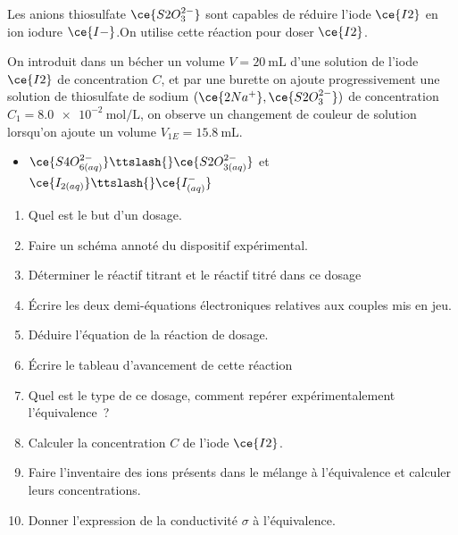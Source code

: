Les anions thiosulfate $\ce{S2O^{2-}_3}$ sont capables de réduire l'iode
$\ce{I2}$ en ion iodure $\ce{I-}$.On utilise cette réaction pour doser
$\ce{I2}$.

On introduit dans un bécher un volume $V=\qty{20}{\mL}$ d'une solution de l'iode
$\ce{I2}$ de concentration $C$, et par une burette on ajoute progressivement une
solution de thiosulfate de sodium $(\ce{2Na^{+}}, \ce{S2O^{2-}_3})$ de
concentration $C_1=\qty{8.0e-2}{\mol\per\L}$, on observe un changement de
couleur de solution lorsqu'on ajoute un volume $V_{1E}=\qty{15.8}{\mL}$.

\begin{donnees}
    \begin{itemize}
        \item $\ce{S4O^{2-}_{6(aq)}}\ttslash{}\ce{S2O^{2-}_{3(aq)}}$ et
              $\ce{I_{2(aq)}}\ttslash{}\ce{I^-_{(aq)}}$
    \end{itemize}
\end{donnees}
\begin{enumerate}
    \item Quel est le but d'un dosage.
    \item Faire un schéma annoté du dispositif expérimental.
    \item Déterminer le réactif titrant et le réactif titré dans ce dosage
    \item Écrire les deux demi-équations électroniques relatives aux couples mis
          en jeu.
    \item Déduire l'équation de la réaction de dosage.
    \item Écrire le tableau d'avancement de cette réaction
    \item Quel est le type de ce dosage, comment repérer expérimentalement
          l'équivalence~?
    \item Calculer la concentration $C$ de l'iode $\ce{I2}$.
    \item Faire l'inventaire des ions présents dans le mélange à l'équivalence
          et calculer leurs concentrations.
    \item Donner l'expression de la conductivité $\sigma$ à l'équivalence.
\end{enumerate}
